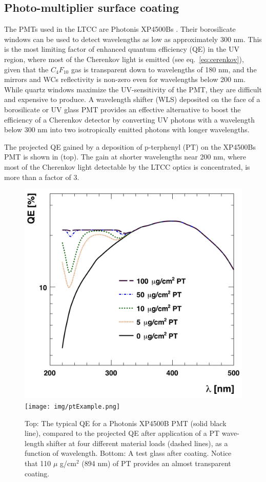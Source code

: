 \subsection{Photo-multiplier surface coating}

The PMTs used in the LTCC are Photonis XP4500Bs \cite{Photonis:2007ta}.
Their borosilicate windows can be used to detect wavelengths as low as approximately
300 nm. This is the most limiting factor of enhanced quantum efficiency (QE) in the UV region, where most of the Cherenkov
light is emitted (see eq.~\ref{eq:cerenkov}), given that the $C_4F_{10}$ gas is transparent down to
wavelengths of 180 nm, and the mirrors and WCs reflectivity is non-zero
even for wavelengths below 200 nm.
While quartz windows maximize the UV-sensitivity of the PMT, they are difficult and expensive to produce.
A wavelength shifter (WLS) deposited on the face of a borosilicate or UV glass
PMT provides an effective alternative to boost the efficiency of a Cherenkov
detector by converting UV photons with a wavelength below 300 nm into two
isotropically emitted photons with longer wavelengths.

The projected QE gained by a deposition of p-terphenyl (PT) on the XP4500Bs
PMT \cite{Koczon:1457653} is shown in  (top).
The gain at shorter wavelengths near 200 nm, where most of the Cherenkov light
detectable by the LTCC optics is concentrated, is more than a factor of 3.


\begin{figure}[h]
	\centering
	\includegraphics[width=0.98\columnwidth,keepaspectratio]{img/pmtQuantumEfficiencyGain.png}
	\texttt{[image: img/ptExample.png]}
	\caption{Top: The typical QE for a Photonis XP4500B PMT (solid black line), compared to the projected QE after application
				of a PT wave-length shifter at four different material loads (dashed lines), as a function of wavelength.
            Bottom: A test glass after coating. Notice that  110 $\mu$ g/cm$^2$ (894 nm) of PT provides an
            almost transparent coating.}
	\label{fig:pmtQuantumEfficiencyGainAndExample}
\end{figure}

